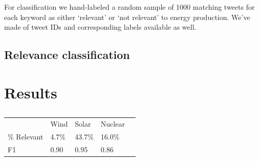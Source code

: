 For classification we hand-labeled a random sample of 1000 matching tweets
for each keyword
as either `relevant' or `not relevant' to energy production. 
We've made of tweet IDs and corresponding labels available as well.



\subsection{Relevance classification}



\subsection{}



\subsection{}


















\section{Results}
\label{sec:corpusCreation.results}

\begin{table}[t]
\begin{tabular}{lllll}
\toprule
   & Wind & Solar & Nuclear \\
     \cmidrule(lr){2-4} 

   \% Relevant & 4.7\% & 43.7\% & 16.0\% \\
F1 & 0.90 & 0.95  & 0.86   \\

  \bottomrule

\end{tabular}
\caption{}
\label{tab:F1-scores}
\end{table}





